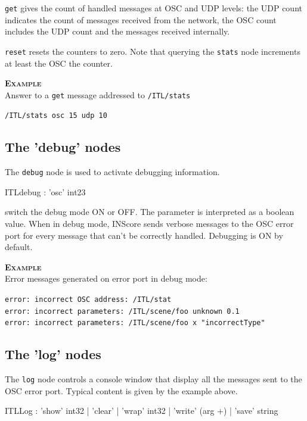 \documentclass[a4paper,twoside]{report}
\newcommand{\subsublevel}[1]	{\subsection{#1}}
\newcommand{\OSC}[1]		{\texttt{#1}}
\newcommand{\example}		{\textbf{\hspace{-1.5cm}\textbf{\textsc{Example }}}}
\let\olditemize\itemize
\let\oldenditemize\enditemize
\renewenvironment{itemize} 	{\olditemize \setlength{\itemsep}{1mm}}{\oldenditemize}
\newcommand{\sample}	[1]			{\vspace{-2mm}\begin{center}\colorbox{mygrey}{
								\begin{minipage}[t]{0.9\columnwidth} 
								{\small \texttt{#1}}
								\end{minipage}}\end{center}}
\begin{document}
\begin{itemize}
\item \OSC{get} gives the count of handled messages at OSC and UDP levels: the UDP count indicates the count of messages received from the network, the OSC count includes the UDP count and the messages received internally.
\item \OSC{reset} resets the counters to zero. Note that querying the \OSC{stats} node increments at least the OSC the counter.
\end{itemize}

\example \\
Answer to a \OSC{get} message addressed to \OSC{/ITL/stats}
\sample{/ITL/stats osc 15 udp 10}


\subsublevel{The 'debug' nodes}
\label{ITLdebug}

The \OSC{debug} node is used to activate debugging information.
\begin{rail}
ITLdebug : 'osc' int23
\end{rail}

\begin{itemize}
\item switch the debug mode ON or OFF. The parameter is interpreted as a boolean value. When in debug mode, INScore sends verbose messages to the OSC error port for every message that can't be correctly handled. Debugging is ON by default.
\end{itemize}

\example \\
Error messages generated on error port in debug mode:
\sample{error:  incorrect OSC address: /ITL/stat\\
error:  incorrect parameters: /ITL/scene/foo unknown 0.1\\
error:  incorrect parameters: /ITL/scene/foo x "incorrectType"
}


\subsublevel{The 'log' nodes}
\label{ITLlog}

The \OSC{log} node controls a console window that display all the messages sent to the OSC error port. Typical content is given by the example above.

\begin{rail}
ITLLog : 'show'  int32
		| 'clear'
		| 'wrap' int32
		| 'write' (arg +)
		| 'save' string
\end{rail}
\end{document}
